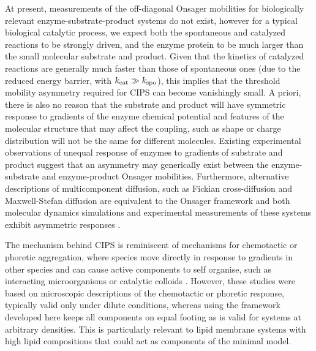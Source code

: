 At present, measurements of the off-diagonal Onsager mobilities for biologically relevant enzyme-substrate-product systems do not exist, however for a typical biological catalytic process, we expect both the spontaneous and catalyzed reactions to be strongly driven, and the enzyme protein to be much larger than the small molecular substrate and product. Given that the kinetics of catalyzed reactions are generally much faster than those of spontaneous ones (due to the reduced energy barrier, with $k_{\mathrm{cat}}\gg k_{\mathrm{spo}}$), this implies that the threshold mobility asymmetry required for CIPS can become vanishingly small. A priori, there is also no reason that the substrate and product will have symmetric response to gradients of the enzyme chemical potential and features of the molecular structure that may affect the coupling, such as shape or charge distribution will not be the same for different molecules. Existing experimental observations \cite{agudo-canalejo_phoresis_2018,zhang_chemically-powered_2021} of unequal response of enzymes to gradients of substrate and product suggest that an asymmetry may generically exist between the enzyme-substrate and enzyme-product Onsager mobilities. Furthermore, alternative descriptions of multicomponent diffusion, such as Fickian cross-diffusion \cite{vanag_cross-diffusion_2009} and Maxwell-Stefan diffusion \cite{taylor_multicomponent_1993} are equivalent to the Onsager framework and both molecular dynamics simulations and experimental measurements of these systems exhibit asymmetric responses \cite{guevara-carrion_mutual_2016, guevara-carrion_interplay_2018}.

The mechanism behind CIPS is reminiscent of mechanisms for chemotactic or phoretic aggregation, where species move directly in response to gradients in other species \cite{keller_initiation_1970, golestanian_phoretic_2019} and can cause active components to self organise, such as interacting microorganisms or catalytic colloids \cite{saha_clusters_2014,agudo-canalejo_active_2019}. However, these studies were based on microscopic descriptions of the chemotactic or phoretic response, typically valid only under dilute conditions, whereas using the framework developed here keeps all components on equal footing as is valid for systems at arbitrary densities. This is particularly relevant to lipid membrane systems with high lipid compositions that could act as components of the minimal model.

